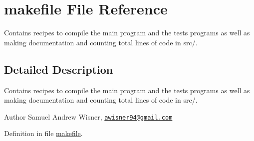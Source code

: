 \hypertarget{makefile}{\section{makefile File Reference}
\label{makefile}
}


Contains recipes to compile the main program and the tests programs as well as making documentation and counting total lines of code in src/.  




\subsection{Detailed Description}
Contains recipes to compile the main program and the tests programs as well as making documentation and counting total lines of code in src/. 

\begin{DoxyAuthor}{Author}
Samuel Andrew Wisner, \href{mailto:awisner94@gmail.com}{\tt awisner94@gmail.\+com} 
\end{DoxyAuthor}


Definition in file \hyperlink{makefile_source}{makefile}.

